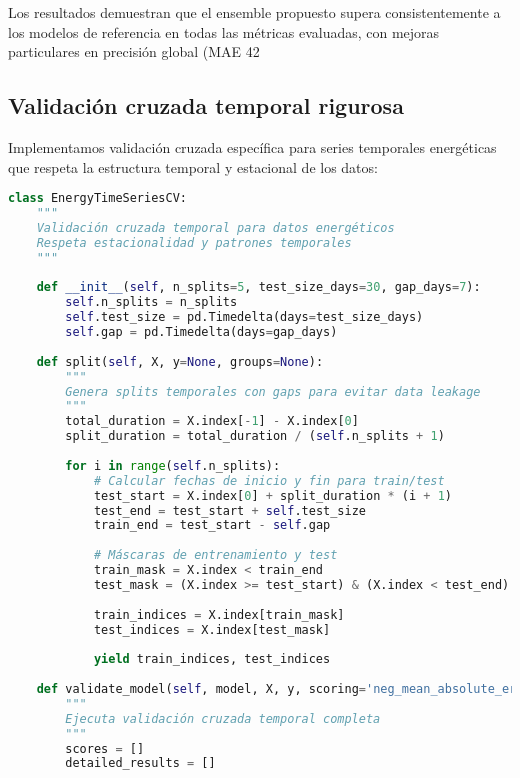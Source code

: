 Los resultados demuestran que el ensemble propuesto supera consistentemente a los modelos de referencia en todas las métricas evaluadas, con mejoras particulares en precisión global (MAE 42%

\subsection{Validación cruzada temporal rigurosa}

Implementamos validación cruzada específica para series temporales energéticas que respeta la estructura temporal y estacional de los datos:

\begin{lstlisting}[language=Python, caption=Validación cruzada temporal específica]
class EnergyTimeSeriesCV:
    """
    Validación cruzada temporal para datos energéticos
    Respeta estacionalidad y patrones temporales
    """
    
    def __init__(self, n_splits=5, test_size_days=30, gap_days=7):
        self.n_splits = n_splits
        self.test_size = pd.Timedelta(days=test_size_days)
        self.gap = pd.Timedelta(days=gap_days)
        
    def split(self, X, y=None, groups=None):
        """
        Genera splits temporales con gaps para evitar data leakage
        """
        total_duration = X.index[-1] - X.index[0]
        split_duration = total_duration / (self.n_splits + 1)
        
        for i in range(self.n_splits):
            # Calcular fechas de inicio y fin para train/test
            test_start = X.index[0] + split_duration * (i + 1)
            test_end = test_start + self.test_size
            train_end = test_start - self.gap
            
            # Máscaras de entrenamiento y test
            train_mask = X.index < train_end
            test_mask = (X.index >= test_start) & (X.index < test_end)
            
            train_indices = X.index[train_mask]
            test_indices = X.index[test_mask]
            
            yield train_indices, test_indices
    
    def validate_model(self, model, X, y, scoring='neg_mean_absolute_error'):
        """
        Ejecuta validación cruzada temporal completa
        """
        scores = []
        detailed_results = []
        

\end{lstlisting}
